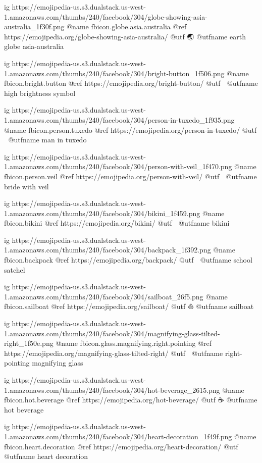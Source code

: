 	ig https://emojipedia-us.s3.dualstack.us-west-1.amazonaws.com/thumbs/240/facebook/304/globe-showing-asia-australia_1f30f.png
	@name fbicon.globe.asia.australia
	@ref https://emojipedia.org/globe-showing-asia-australia/
	@utf 🌏
	@utfname earth globe asia-australia

	ig https://emojipedia-us.s3.dualstack.us-west-1.amazonaws.com/thumbs/240/facebook/304/bright-button_1f506.png
	@name fbicon.bright.button
	@ref https://emojipedia.org/bright-button/
	@utf 🔆
	@utfname high brightness symbol

	ig https://emojipedia-us.s3.dualstack.us-west-1.amazonaws.com/thumbs/240/facebook/304/person-in-tuxedo_1f935.png
	@name fbicon.person.tuxedo
	@ref https://emojipedia.org/person-in-tuxedo/
	@utf 🤵
	@utfname man in tuxedo

	ig https://emojipedia-us.s3.dualstack.us-west-1.amazonaws.com/thumbs/240/facebook/304/person-with-veil_1f470.png
	@name fbicon.person.veil
	@ref https://emojipedia.org/person-with-veil/
	@utf 👰
	@utfname bride with veil

	ig https://emojipedia-us.s3.dualstack.us-west-1.amazonaws.com/thumbs/240/facebook/304/bikini_1f459.png
	@name fbicon.bikini
	@ref https://emojipedia.org/bikini/
	@utf 👙
	@utfname bikini

	ig https://emojipedia-us.s3.dualstack.us-west-1.amazonaws.com/thumbs/240/facebook/304/backpack_1f392.png
	@name fbicon.backpack
	@ref https://emojipedia.org/backpack/
	@utf 🎒
	@utfname school satchel

	ig https://emojipedia-us.s3.dualstack.us-west-1.amazonaws.com/thumbs/240/facebook/304/sailboat_26f5.png
	@name fbicon.sailboat
	@ref https://emojipedia.org/sailboat/
	@utf ⛵
	@utfname sailboat

	ig https://emojipedia-us.s3.dualstack.us-west-1.amazonaws.com/thumbs/240/facebook/304/magnifying-glass-tilted-right_1f50e.png
	@name fbicon.glass.magnifying.right.pointing
	@ref https://emojipedia.org/magnifying-glass-tilted-right/
	@utf 🔎
	@utfname right-pointing magnifying glass

	ig https://emojipedia-us.s3.dualstack.us-west-1.amazonaws.com/thumbs/240/facebook/304/hot-beverage_2615.png
	@name fbicon.hot.beverage
	@ref https://emojipedia.org/hot-beverage/
	@utf ☕
	@utfname hot beverage

	ig https://emojipedia-us.s3.dualstack.us-west-1.amazonaws.com/thumbs/240/facebook/304/heart-decoration_1f49f.png
	@name fbicon.heart.decoration
	@ref https://emojipedia.org/heart-decoration/
	@utf 💟
	@utfname heart decoration

